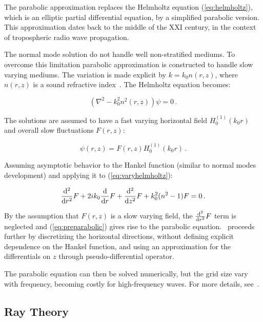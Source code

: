 The parabolic approximation replaces the Helmholtz equation (\ref{eq:helmholtz}),
which is an elliptic partial differential equation, by a simplified parabolic
version. This approximation dates back to the middle of the $\mathrm{XXI}$
century, in the context of tropospheric radio wave propagation.

The normal mode solution do not handle well non-stratified mediums. To overcome
this limitation parabolic approximation is constructed to handle slow varying
mediums. The variation is made explicit by $k = k_0n(r,z)$, where $n(r,z)$ is a
sound refractive index~\cite{LURTON}. The Helmholtz equation becomes:

\begin{equation}
\label{eq:varyhelmholtz}
(\nabla^2 - k_0^2n^2(r,z))\psi = 0\,.
\end{equation}

The solutions are assumed to have a fast varying horizontal field
$H_0^{(1)}(k_0r)$ and overall slow fluctuations $F(r,z)$:

\begin{equation*}
\psi(r,z) = F(r,z)H_0^{(1)}(k_0r)\,.
\end{equation*}

Assuming asymptotic behavior to the Hankel function (similar to normal modes
development) and applying it to (\ref{eq:varyhelmholtz}):

\begin{equation}
\label{eq:preparabolic}
\frac{\mathrm{d^{2}}}{\mathrm{d}{r}^{2}}F + 2ik_0\frac{\mathrm{d}}{\mathrm{d}r}F + \frac{\mathrm{d^{2}}}{\mathrm{d}{z}^{2}}F + k_0^2(n^2-1)F = 0\,.
\end{equation}

By the assumption that $F(r,z)$ is a slow varying field, the $\frac{\mathrm{d^{2}}}{\mathrm{d}{r}^{2}}F$
term is neglected and (\ref{eq:preparabolic}) gives rise to the parabolic
equation.~\citet{LURTON} proceeds further by discretizing the horizontal
directions, without defining explicit dependence on the Hankel function, and
using an approximation for the differentials on $z$ through pseudo-differential
operator.

The parabolic equation can then be solved numerically, but the grid size vary
with frequency, becoming costly for high-frequency waves. For more
details, see~\citet{jensen2011computational}.

\subsection{Ray Theory}
\label{ss:raytheory}

